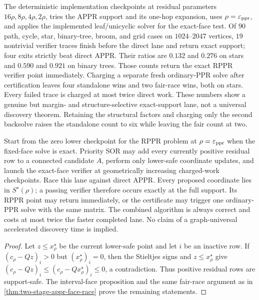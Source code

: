 The deterministic implementation checkpoints at residual parameters
$16\rho,8\rho,4\rho,2\rho$, tries the APPR support and its one-hop expansion,
uses $\rho=\varepsilon_{\mathrm{ppr}}$, and applies the implemented leaf/unicyclic solver for the exact-face test.  Of
$90$ path, cycle, star, binary-tree, broom, and grid cases on
$1024$--$2047$ vertices, $19$ nontrivial verifier traces finish before the
direct lane and return exact support; four exits strictly beat direct APPR.
Their ratios are $0.132$ and $0.276$ on stars and $0.590$ and $0.921$ on
binary trees.  Those counts return the exact RPPR verifier point immediately.
Charging a separate fresh ordinary-PPR solve after certification leaves four
standalone wins and two fair-race wins, both on stars.  Every failed
trace is charged at most twice direct work.  These numbers show a genuine
but margin- and structure-selective exact-support lane, not a universal
discovery theorem.
Retaining the structural factors and charging only the second backsolve raises
the standalone count to six while leaving the fair count at two.

\begin{corollary}
\label{cor:two-stage-sor-support-then-solve}
Start from the zero lower checkpoint for the RPPR problem at
$\rho=\varepsilon_{\mathrm{ppr}}$ when the fixed-face solve is exact.  Priority SOR may add every currently positive residual row
to a connected candidate $A$, perform only lower-safe coordinate updates,
and launch the exact-face verifier at geometrically increasing charged-work
checkpoints.  Race this lane against direct APPR.  Every proposed coordinate
lies in $S^\star(\rho)$; a passing verifier therefore occurs exactly at the
full support.  Its RPPR point may return immediately, or the certificate may
trigger one ordinary-PPR solve with the same matrix.  The combined
algorithm is always correct and costs at most twice the faster completed
lane.  No claim of a graph-universal accelerated discovery time is implied.
\end{corollary}

\begin{proof}
Let $z\leq x_\rho^\star$ be the current lower-safe point and let $i$ be an
inactive row.  If $(c_\rho-Qz)_i>0$ but $(x_\rho^\star)_i=0$, then the
Stieltjes signs and $z\leq x_\rho^\star$ give
$(c_\rho-Qz)_i\leq(c_\rho-Qx_\rho^\star)_i\leq0$, a contradiction.  Thus
positive residual rows are support-safe.  The interval-face proposition and
the same fair-race argument as in
\cref{thm:two-stage-appr-face-race} prove the remaining statements.
\end{proof}

